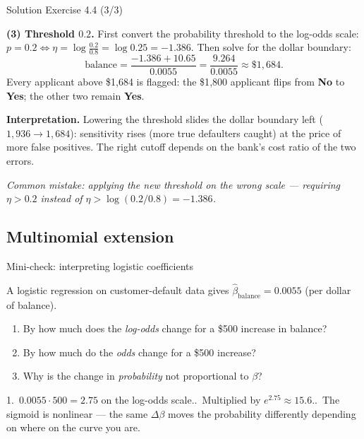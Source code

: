 \documentclass[aspectratio=169,11pt]{beamer}
\begin{document}
\begin{frame}{Solution \textemdash{} Exercise 4.4 (3/3)}
\begin{solutionbox}
\textbf{(3) Threshold $0.2$.}
First convert the probability threshold to the log-odds scale:
$p=0.2 \iff \eta=\log\!\frac{0.2}{0.8}=\log 0.25 = -1.386$. Then solve
for the dollar boundary:
\[
  \text{balance} = \frac{-1.386 + 10.65}{0.0055}
                 = \frac{9.264}{0.0055} \approx \$1{,}684 .
\]
Every applicant above \$1{,}684 is flagged: the \$1{,}800 applicant
flips from \textbf{No} to \textbf{Yes}; the other two remain
\textbf{Yes}.

\vspace{1mm}
\textbf{Interpretation.} Lowering the threshold slides the dollar
boundary left ($1{,}936\to1{,}684$): sensitivity rises (more true
defaulters caught) at the price of more false positives. The right
cutoff depends on the bank's cost ratio of the two errors.

\vspace{1mm}
\emph{Common mistake: applying the new threshold on the wrong scale ---
requiring $\eta>0.2$ instead of $\eta>\log(0.2/0.8)=-1.386$.}
\end{solutionbox}
\end{frame}

\subsection{Multinomial extension}



\begin{frame}{Mini-check: interpreting logistic coefficients}
  \begin{readme}
    A logistic regression on customer-default data gives
    $\hat\beta_{\text{balance}} = 0.0055$ (per dollar of balance).
    \begin{enumerate}
      \item By how much does the \emph{log-odds} change for a \$500
            increase in balance?
      \item By how much do the \emph{odds} change for a \$500 increase?
      \item Why is the change in \emph{probability} not
            proportional to $\beta$?
    \end{enumerate}
  \end{readme}
  \begin{takeaway}[Answers]
    1.\ $0.0055 \cdot 500 = 2.75$ on the log-odds scale..\ Multiplied by $e^{2.75} \approx 15.6$..\ The sigmoid is nonlinear --- the same $\Delta\beta$ moves the
        probability differently depending on where on the curve you are.
  \end{takeaway}
\end{frame}
\end{document}
